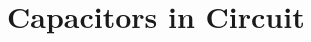 \documentclass[12pt,aspectratio=169]{beamer}
\begin{document}
%
%
%
%    
%
%


\section{Capacitors in Circuit}
\end{document}

